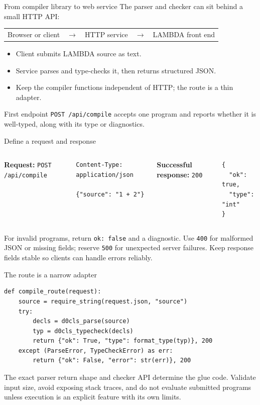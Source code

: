\documentclass[aspectratio=169,11pt]{beamer}
\begin{document}
\begin{frame}{From compiler library to web service}
The parser and checker can sit behind a small HTTP API:
\begin{center}
\begin{tabular}{c c c c c}
Browser or client & $\longrightarrow$ & HTTP service & $\longrightarrow$ & LAMBDA front end \\
\end{tabular}
\end{center}
\begin{itemize}
  \item Client submits LAMBDA source as text.
  \item Service parses and type-checks it, then returns structured JSON.
  \item Keep the compiler functions independent of HTTP; the route is a thin adapter.
\end{itemize}
\begin{block}{First endpoint}
\texttt{POST /api/compile} accepts one program and reports whether it is well-typed, along with its type or diagnostics.
\end{block}
\end{frame}

\begin{frame}[fragile]{Define a request and response}
\begin{columns}[T]
\textbf{Request:} \texttt{POST /api/compile}
\begin{lstlisting}
Content-Type: application/json

{"source": "1 + 2"}
\end{lstlisting}
\textbf{Successful response:} \texttt{200}
\begin{lstlisting}
{
  "ok": true,
  "type": "int"
}
\end{lstlisting}
\end{columns}
\medskip
For invalid programs, return \texttt{ok: false} and a diagnostic. Use \texttt{400} for malformed JSON or missing fields; reserve \texttt{500} for unexpected server failures. Keep response fields stable so clients can handle errors reliably.
\end{frame}

\begin{frame}[fragile]{The route is a narrow adapter}
\begin{lstlisting}
def compile_route(request):
    source = require_string(request.json, "source")
    try:
        decls = d0cls_parse(source)
        typ = d0cls_typecheck(decls)
        return {"ok": True, "type": format_type(typ)}, 200
    except (ParseError, TypeCheckError) as err:
        return {"ok": False, "error": str(err)}, 200
\end{lstlisting}
The exact parser return shape and checker API determine the glue code. Validate input size, avoid exposing stack traces, and do not evaluate submitted programs unless execution is an explicit feature with its own limits.
\end{frame}
\end{document}
